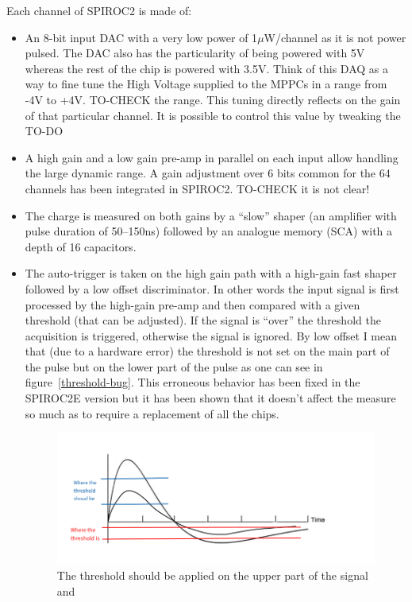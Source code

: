 Each channel of SPIROC2 is made of:
\begin{itemize}
\item An 8-bit input DAC with a very low power of 1$\mu$W/channel as it is not
  power pulsed. The DAC also has the particularity of being powered with 5V
  whereas the rest of the chip is powered with 3.5V. Think of this DAQ as a way
  to fine tune the High Voltage supplied to the MPPCs in a range from -4V to
  +4V. TO-CHECK the range. This tuning directly reflects on the gain of that
  particular channel. It is possible to control this value by tweaking the TO-DO
\item A high gain and a low gain pre-amp in parallel on each input allow
  handling the large dynamic range. A gain adjustment over 6 bits common for the
  64 channels has been integrated in SPIROC2. TO-CHECK it is not clear!
\item The charge is measured on both gains by a ``slow'' shaper (an amplifier
  with pulse duration of 50–150ns) followed by an analogue memory (SCA) with a
  depth of 16 capacitors.
\item The auto-trigger is taken on the high gain path with a high-gain fast
  shaper followed by a low offset discriminator. In other words the input signal
  is first processed by the high-gain pre-amp and then compared with a given
  threshold (that can be adjusted). If the signal is ``over'' the threshold the
  acquisition is triggered, otherwise the signal is ignored. By low offset I
  mean that (due to a hardware error) the threshold is not set on the main part
  of the pulse but on the lower part of the pulse as one can see in
  figure~\ref{threshold-bug}. This erroneous behavior has been fixed in the
  SPIROC2E version but it has been shown that it doesn't affect the measure so
  much as to require a replacement of all the chips.
  \begin{figure}[ht]
    \includegraphics[width=\linewidth]{threshold-bug.png}
    \caption{The threshold should be applied on the upper part of the signal and
}
\end{figure}
\end{itemize}
